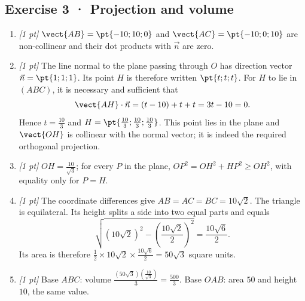\subsection*{Exercise 3 · Projection and volume}\begin{enumerate}

\item \textit{[1 pt]} $\vect{AB}=\pt{-10;10;0}$ and $\vect{AC}=\pt{-10;0;10}$ are non-collinear and their dot products with $\vec n$ are zero.

\item \textit{[1 pt]} The line normal to the plane passing through $O$ has direction vector $\vec n=\pt{1;1;1}$. Its point $H$ is therefore written $\pt{t;t;t}$. For $H$ to lie in $(ABC)$, it is necessary and sufficient that
\[\vect{AH}\cdot\vec n=(t-10)+t+t=3t-10=0.\]
Hence $t=\frac{10}{3}$ and $H=\pt{\frac{10}{3};\frac{10}{3};\frac{10}{3}}$. This point lies in the plane and $\vect{OH}$ is collinear with the normal vector; it is indeed the required orthogonal projection.

\item \textit{[1 pt]} $OH=\frac{10}{\sqrt{3}}$; for every $P$ in the plane, $OP^2=OH^2+HP^2\ge OH^2$, with equality only for $P=H$.

\item \textit{[1 pt]} The coordinate differences give $AB=AC=BC=10\sqrt2$. The triangle is equilateral. Its height splits a side into two equal parts and equals
\[\sqrt{(10\sqrt2)^2-(\frac{10\sqrt{2}}{2})^2}=\frac{10\sqrt6}{2}.\]
Its area is therefore $\frac12\times 10\sqrt2\times\frac{10\sqrt6}{2}=50\sqrt3$ square units.

\item \textit{[1 pt]} Base $ABC$: volume $\frac{(50\sqrt3)(\frac{10}{\sqrt{3}})}{3}=\frac{500}{3}$. Base $OAB$: area $50$ and height $10$, the same value.

\end{enumerate}

